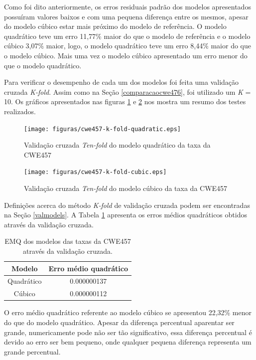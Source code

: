 Como foi dito anteriormente, os erros residuais padrão dos modelos apresentados
possuíram valores baixos e com uma pequena diferença entre os mesmos, apesar do
modelo cúbico estar mais próximo do modelo de referência. O modelo quadrático
teve um erro 11,77\% maior do que o modelo de referência e o modelo cúbico
3,07\% maior, logo, o modelo quadrático teve um erro 8,44\% maior do que o
modelo cúbico. Mais uma vez o modelo cúbico apresentado um erro menor do que o
modelo quadrático.

Para verificar o desempenho de cada um dos modelos foi feita uma validação
cruzada \textit{K-fold}. Assim como na Seção \ref{comparacaocwe476}, foi
utilizado um \textit{K} = 10. Os gráficos apresentados nas figuras
\ref{fig:cwe457-k-fold-quadratic} e \ref{fig:cwe457-k-fold-cubic} nos mostra um
resumo dos testes realizados.

\begin{figure}[h]
  \centering
  \texttt{[image: figuras/cwe457-k-fold-quadratic.eps]}
      \caption{Validação cruzada \textit{Ten-fold} do modelo
      quadrático da taxa da CWE457}
  \label{fig:cwe457-k-fold-quadratic}
\end{figure}

\begin{figure}[h]
  \centering
  \texttt{[image: figuras/cwe457-k-fold-cubic.eps]}
      \caption{Validação cruzada \textit{Ten-fold} do modelo
      cúbico da taxa da CWE457}
  \label{fig:cwe457-k-fold-cubic}
\end{figure}

Definições acerca do método \textit{K-fold} de validação cruzada podem ser
encontradas na Seção \ref{valmodels}. A Tabela \ref{tab:cwe457-emq} apresenta os
erros médios quadráticos obtidos através da validação cruzada.

\begin{table}[h]
 \centering
 \begin{tabular}{cc}
  \hline
  \rowcolor[HTML]{EFEFEF} 
  {Modelo} & {Erro médio quadrático} \\ \hline
  Quadrático   & 0.000000137 \\ \hline
  Cúbico       & 0.000000112 \\ \hline
 \end{tabular}
 \caption{EMQ dos modelos das taxas da CWE457 através da validação cruzada.}
 \label{tab:cwe457-emq}
\end{table}

O erro médio quadrático referente ao modelo cúbico se apresentou 22,32\% menor
do que do modelo quadrático. Apesar da diferença percentual aparentar ser
grande, numericamente pode não ser tão significativo, essa diferença percentual
é devido ao erro ser bem pequeno, onde qualquer pequena diferença representa um
grande percentual.

